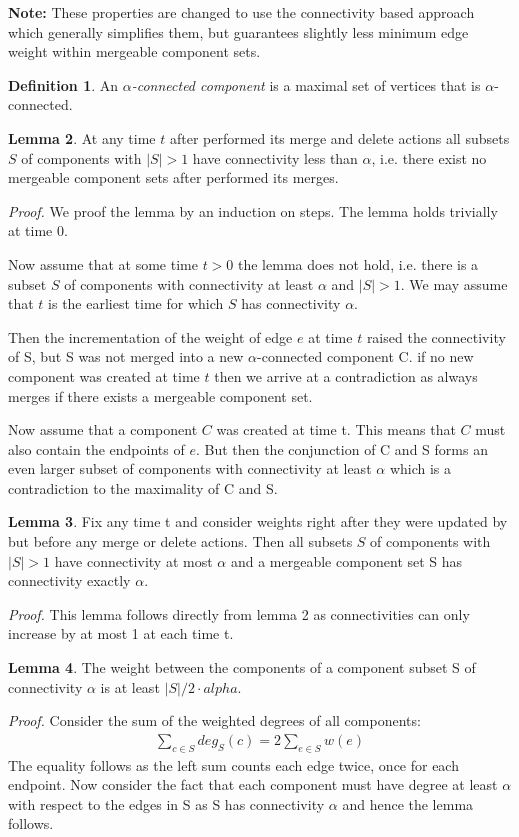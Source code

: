 \documentclass[a4paper,xcolor=dvipsnames, tikz, 12pt]{article}
\newcommand{\crep}{\text{C{\scriptsize REP}}}
\theoremstyle{definition}
\newtheorem{defi}{Definition}
\newtheorem{lemma}[defi]{Lemma}
\begin{document}
\textbf{Note:} These properties are changed to use the connectivity based approach which generally simplifies them, but guarantees slightly less minimum edge weight within mergeable component sets.
\begin{defi}
	An $\alpha$\textit{-connected component} is a maximal set of vertices that is $\alpha$-connected.
\end{defi}

\begin{lemma}
	At any time $t$ after \crep{} performed its merge and delete actions all subsets $S$ of components with $|S|>1$ have connectivity less than $\alpha$, i.e. there exist no mergeable component sets after \crep{} performed its merges.
\end{lemma}

\textit{Proof.} We proof the lemma by an induction on steps. The lemma holds trivially at time 0.

Now assume that at some time $t>0$ the lemma does not hold, i.e. there is a subset $S$ of components with connectivity at least $\alpha$ and $|S|>1$. We may assume that $t$ is the earliest time for which $S$ has connectivity $\alpha$.

Then the incrementation of the weight of edge $e$ at time $t$ raised the connectivity of S, but S was not merged into a new $\alpha$-connected component C. if no new component was created at time $t$ then we arrive at a contradiction as \crep{} always merges if there exists a mergeable component set.

Now assume that a component $C$ was created at time t. This means that $C$ must also contain the endpoints of $e$. But then the conjunction of C and S forms an even larger subset of components with connectivity at least $\alpha$ which is a contradiction to the maximality of C and S.

\begin{lemma}
	\label{mergeable_lemma}
	Fix any time t and consider weights right after they were updated by \crep{} but before any merge or delete actions. Then all subsets $S$ of components with $|S|>1$ have connectivity at most $\alpha$ and a mergeable component set S has connectivity exactly $\alpha$.
\end{lemma}

\textit{Proof.} This lemma follows directly from lemma 2 as connectivities can only increase by at most 1 at each time t.

\begin{lemma}
	\label{cut_lemma}
	The weight between the components of a component subset S of connectivity $\alpha$ is at least $|S|/2 \cdot alpha$.
\end{lemma}
\textit{Proof.} Consider the sum of the weighted degrees of all components:
\begin{align*}
\sum_{c\in S}deg_S(c)=2\sum_{e\in S}w(e)
\end{align*}
The equality follows as the left sum counts each edge twice, once for each endpoint.
Now consider the fact that each component must have degree at least $\alpha$ with respect to the edges in S as S has connectivity $\alpha$ and hence the lemma follows.
\end{document}
